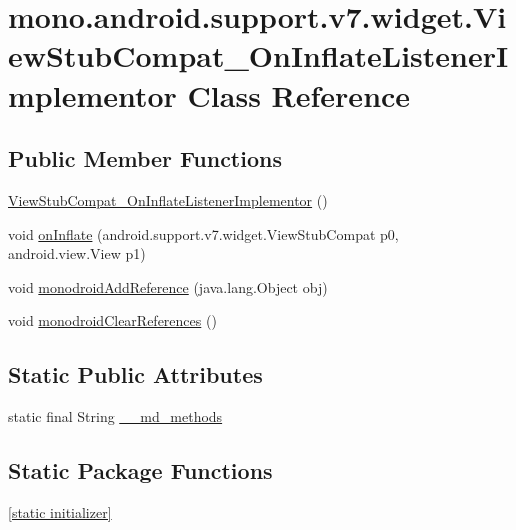 \hypertarget{classmono_1_1android_1_1support_1_1v7_1_1widget_1_1_view_stub_compat___on_inflate_listener_implementor}{
\section{mono.android.support.v7.widget.ViewStubCompat\_\-OnInflateListenerImplementor Class Reference}
\label{classmono_1_1android_1_1support_1_1v7_1_1widget_1_1_view_stub_compat___on_inflate_listener_implementor}
}
\subsection*{Public Member Functions}
\begin{CompactItemize}
\item 
\hyperlink{classmono_1_1android_1_1support_1_1v7_1_1widget_1_1_view_stub_compat___on_inflate_listener_implementor_e2f21c596eefebf17053928c18deed0c}{ViewStubCompat\_\-OnInflateListenerImplementor} ()
\item 
void \hyperlink{classmono_1_1android_1_1support_1_1v7_1_1widget_1_1_view_stub_compat___on_inflate_listener_implementor_f5dd2c498ef67b36825b1c2071bf528f}{onInflate} (android.support.v7.widget.ViewStubCompat p0, android.view.View p1)
\item 
void \hyperlink{classmono_1_1android_1_1support_1_1v7_1_1widget_1_1_view_stub_compat___on_inflate_listener_implementor_c26d53bed514e46ac48a1704e5a0f7f5}{monodroidAddReference} (java.lang.Object obj)
\item 
void \hyperlink{classmono_1_1android_1_1support_1_1v7_1_1widget_1_1_view_stub_compat___on_inflate_listener_implementor_bf26bd40d8c3a6339bfbc544da762a52}{monodroidClearReferences} ()
\end{CompactItemize}
\subsection*{Static Public Attributes}
\begin{CompactItemize}
\item 
static final String \hyperlink{classmono_1_1android_1_1support_1_1v7_1_1widget_1_1_view_stub_compat___on_inflate_listener_implementor_75afa2a9c0ea491c4b7e56d95f3cbfcb}{\_\-\_\-md\_\-methods}
\end{CompactItemize}
\subsection*{Static Package Functions}
\begin{CompactItemize}
\item 
\hyperlink{classmono_1_1android_1_1support_1_1v7_1_1widget_1_1_view_stub_compat___on_inflate_listener_implementor_bac4cbc9a69f7781f037918a50e17aed}{\mbox{[}static initializer\mbox{]}}
\end{CompactItemize}

